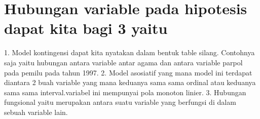 \section{Hubungan variable pada hipotesis dapat kita bagi 3 yaitu}
1.	Model kontingensi dapat kita nyatakan dalam bentuk table silang. Contohnya saja yaitu hubungan antara variable antar agama dan antara 
variable parpol pada pemilu pada tahun 1997. 
2.	Model asosiatif yang mana model ini terdapat diantara 2 buah variable yang mana keduanya sama sama ordinal atau keduanya sama sama 
interval.variabel ini mempunyai pola monoton linier.
3.	Hubungan fungsional yaitu merupakan antara suatu variable yang berfungsi di dalam sebuah variable lain.


